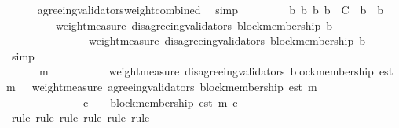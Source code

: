 \begin{isabellebody}
\ \ \ \ \isamarkupfalse%
\ agreeing{\isacharunderscore}validators{\isacharunderscore}weight{\isacharunderscore}combined\ \isamarkupfalse%
\ simp\isanewline
\ \ \isamarkupfalse%
\ {\isachardoublequoteopen}{\isasymforall}\ {\isasymsigma}\ {\isasymin}\ {\isasymSigma}{\isachardot}\ {\isasymforall}\ b\ b{\isacharprime}{\isachardot}\ {\isacharbraceleft}b{\isacharcomma}\ b{\isacharprime}{\isacharbraceright}\ {\isasymsubseteq}\ C\ {\isasymand}\ b{\isacharprime}\ {\isasymdownharpoonright}\ b\isanewline
\ \ \ \ \ \ \ \ {\isasymlongrightarrow}\ weight{\isacharunderscore}measure\ {\isacharparenleft}disagreeing{\isacharunderscore}validators\ {\isacharparenleft}block{\isacharunderscore}membership\ b{\isacharcomma}\ {\isasymsigma}{\isacharparenright}{\isacharparenright}\ \isanewline
\ \ \ \ \ \ \ \ \ \ \ \ \ \ {\isasymge}\ weight{\isacharunderscore}measure\ {\isacharparenleft}disagreeing{\isacharunderscore}validators\ {\isacharparenleft}block{\isacharunderscore}membership\ b{\isacharprime}{\isacharcomma}\ {\isasymsigma}{\isacharparenright}{\isacharparenright}{\isachardoublequoteclose}\isanewline
\ \ \ \ \isamarkupfalse%
\ simp\isanewline
\ \ \isamarkupfalse%
\ {\isachardoublequoteopen}{\isasymforall}\ {\isasymsigma}\ {\isasymin}\ {\isasymSigma}{\isachardot}\ {\isasymforall}\ m\ {\isasymin}\ {\isasymsigma}{\isachardot}\ {\isasymforall}\ {\isasymsigma}{\isacharprime}\ {\isasymin}\ {\isasymSigma}{\isachardot}\ {\isasymsigma}\ {\isasymsubseteq}\ {\isasymsigma}{\isacharprime}\ {\isasymlongrightarrow}\ weight{\isacharunderscore}measure\ {\isacharparenleft}disagreeing{\isacharunderscore}validators\ {\isacharparenleft}block{\isacharunderscore}membership\ {\isacharparenleft}est\ m{\isacharparenright}{\isacharcomma}\ {\isasymsigma}{\isacharprime}{\isacharparenright}{\isacharparenright}\ {\isacharless}\ weight{\isacharunderscore}measure\ {\isacharparenleft}agreeing{\isacharunderscore}validators\ {\isacharparenleft}block{\isacharunderscore}membership\ {\isacharparenleft}est\ m{\isacharparenright}{\isacharcomma}\ {\isasymsigma}{\isacharprime}{\isacharparenright}{\isacharparenright}\ \isanewline
\ \ \ \ \ \ \ \ \ \ \ \ {\isasymlongrightarrow}\ {\isacharparenleft}{\isasymforall}\ c\ {\isasymin}\ {\isasymepsilon}\ {\isasymsigma}{\isacharprime}{\isachardot}\ block{\isacharunderscore}membership\ {\isacharparenleft}est\ m{\isacharparenright}\ c{\isacharparenright}{\isachardoublequoteclose}\isanewline
\ \ \ \ \isamarkupfalse%
\ {\isacharparenleft}rule{\isacharcomma}\ rule{\isacharcomma}\ rule{\isacharcomma}\ rule{\isacharcomma}\ rule{\isacharcomma}\ rule{\isacharparenright}\isanewline

\end{isabellebody}
